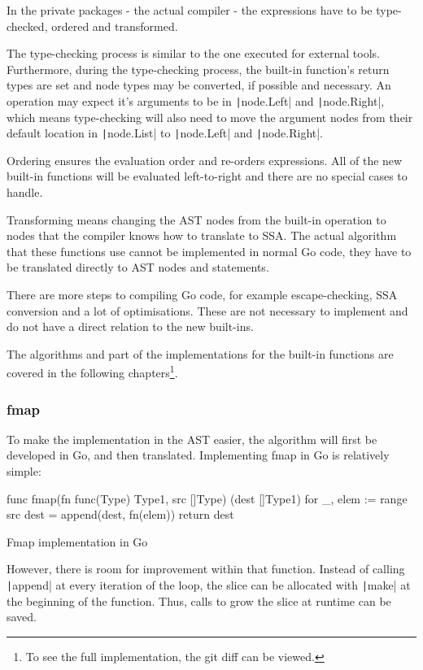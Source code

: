 In the private packages - the actual compiler - the expressions have to be
type-checked, ordered and transformed.

The type-checking process is similar to the one executed for external tools.
Furthermore, during the type-checking
process, the built-in function's return types are set and node types
may be converted, if possible and necessary.
An operation may expect it's arguments to be in \texttt|node.Left|
and \texttt|node.Right|, which means type-checking will also need
to move the argument nodes from their default location in
\texttt|node.List| to \texttt|node.Left| and
\texttt|node.Right|.

Ordering ensures the evaluation order and re-orders expressions. All of
the new built-in functions will be evaluated left-to-right and there are no
special cases to handle.

Transforming means changing the AST nodes from the built-in operation to
nodes that the compiler knows how to translate to SSA. The actual algorithm
that these functions use cannot be implemented in normal Go code, they have to be
translated directly to AST nodes and statements.

There are more steps to compiling Go code, for example escape-checking,
SSA conversion and a lot of optimisations. These are not necessary to
implement and do not have a direct relation to the new built-ins.

The algorithms and part of the implementations for the built-in
functions are covered in the following chapters\footnote{
	To see the full implementation, the git diff can be viewed\autocite{ba-go1-14-thesis-diff}.
}.

\subsubsection{fmap}\label{ch:impl-fmap}

To make the implementation in the AST easier, the algorithm will first be
developed in Go, and then translated. Implementing fmap in Go is relatively
simple:

\begin{listing}
	\begin{gocode}
func fmap(fn func(Type) Type1, src []Type) (dest []Type1) {
	for _, elem := range src {
		dest = append(dest, fn(elem))
	}
	return dest
}
\end{gocode}
	\caption{Fmap implementation in Go}\label{code:fmap-go}
\end{listing}
However, there is room for improvement within that function. Instead
of calling \texttt|append| at every iteration of the loop, the slice can
be allocated with \texttt|make| at the beginning of the function. Thus,
calls to grow the slice at runtime can be saved.

